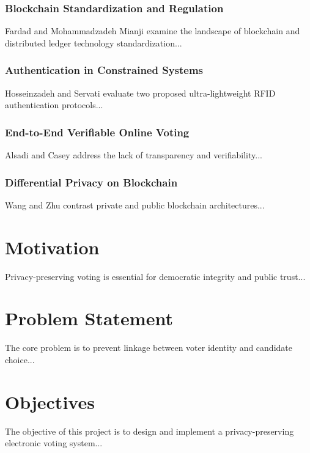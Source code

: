 \subsubsection{\textbf{Blockchain Standardization and Regulation}}
Fardad and Mohammadzadeh Mianji \cite{Fardad2025} examine the landscape of blockchain and distributed ledger technology standardization...

\subsubsection{\textbf{Authentication in Constrained Systems}}
Hosseinzadeh and Servati \cite{Hosseinzadeh2024} evaluate two proposed ultra-lightweight RFID authentication protocols...

\subsubsection{\textbf{End-to-End Verifiable Online Voting}}
Alsadi and Casey \cite{Alsadi2024} address the lack of transparency and verifiability...

\subsubsection{\textbf{Differential Privacy on Blockchain}}
Wang and Zhu \cite{Wang2023} contrast private and public blockchain architectures...

\section[Motivation]{\textbf{Motivation}}
Privacy-preserving voting is essential for democratic integrity and public trust...

\section[Problem Statement]{\textbf{Problem Statement}}
The core problem is to prevent linkage between voter identity and candidate choice...

\section[Objectives]{\textbf{Objectives}}
The objective of this project is to design and implement a privacy-preserving electronic voting system...

